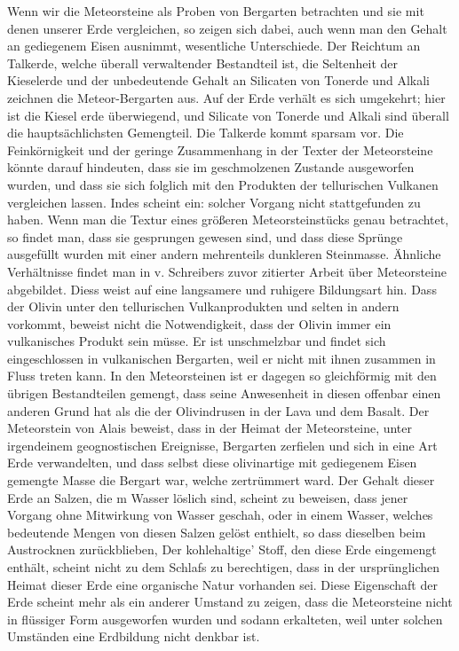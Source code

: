 \documentclass[a4paper, 11pt, oneside]{article}
\begin{document}
Wenn wir die Meteorsteine als Proben von Bergarten betrachten und sie mit denen unserer Erde vergleichen, so zeigen sich dabei, auch wenn man den Gehalt an gediegenem Eisen ausnimmt, wesentliche Unterschiede. Der Reichtum an Talkerde, welche überall verwaltender Bestandteil ist, die Seltenheit der Kieselerde und der unbedeutende Gehalt an Silicaten von Tonerde und Alkali zeichnen die Meteor-Bergarten aus. Auf der Erde verhält es sich umgekehrt; hier ist die Kiesel erde überwiegend, und Silicate von Tonerde und Alkali sind überall die hauptsächlichsten Gemengteil. Die Talkerde kommt sparsam vor. Die Feinkörnigkeit und der geringe Zusammenhang in der Texter der Meteorsteine könnte darauf hindeuten, dass sie im geschmolzenen Zustande ausgeworfen wurden, und dass sie sich folglich mit den Produkten der tellurischen Vulkanen vergleichen lassen. Indes scheint ein: solcher Vorgang nicht stattgefunden zu haben. Wenn man die Textur eines größeren Meteorsteinstücks genau betrachtet, so findet man, dass sie gesprungen gewesen sind, und dass diese Sprünge ausgefüllt wurden mit einer andern mehrenteils dunkleren Steinmasse. Ähnliche Verhältnisse findet man in v. Schreibers zuvor zitierter Arbeit über Meteorsteine abgebildet. Diess weist auf eine langsamere und ruhigere Bildungsart hin. Dass der Olivin unter den tellurischen Vulkanprodukten und selten in andern vorkommt, beweist nicht die Notwendigkeit, dass der Olivin immer ein vulkanisches Produkt sein müsse. Er ist unschmelzbar und findet sich eingeschlossen in vulkanischen Bergarten, weil er nicht mit ihnen zusammen in Fluss treten kann. In den Meteorsteinen ist er dagegen so gleichförmig mit den übrigen Bestandteilen gemengt, dass seine Anwesenheit in diesen offenbar einen anderen Grund hat als die der Olivindrusen in der Lava und dem Basalt. Der Meteorstein von Alais beweist, dass in der Heimat der Meteorsteine, unter irgendeinem geognostischen Ereignisse, Bergarten zerfielen und sich in eine Art Erde verwandelten, und dass selbst diese olivinartige mit gediegenem Eisen gemengte Masse die Bergart war, welche zertrümmert ward. Der Gehalt dieser Erde an Salzen, die m Wasser löslich sind, scheint zu beweisen, dass jener Vorgang ohne Mitwirkung von Wasser geschah, oder in einem Wasser, welches bedeutende Mengen von diesen Salzen gelöst enthielt, so dass dieselben beim Austrocknen zurückblieben, Der kohlehaltige' Stoff, den diese Erde eingemengt enthält, scheint nicht zu dem Schlafs zu berechtigen, dass in der ursprünglichen Heimat dieser Erde eine organische Natur vorhanden sei. Diese Eigenschaft der Erde scheint mehr als ein anderer Umstand zu zeigen, dass die Meteorsteine nicht in flüssiger Form ausgeworfen wurden und sodann erkalteten, weil unter solchen Umständen eine Erdbildung nicht denkbar ist.
\end{document}
